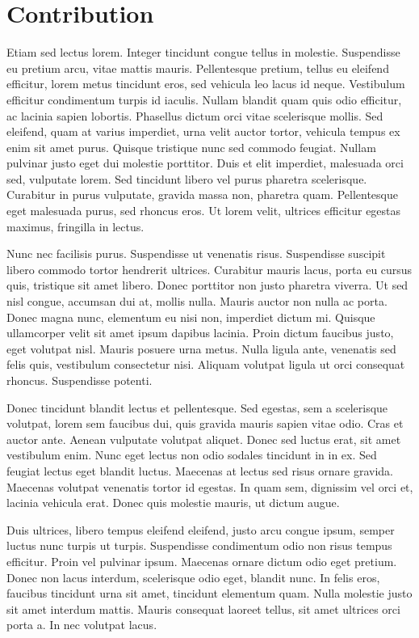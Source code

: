 \section{Contribution}%
Etiam sed lectus lorem. Integer tincidunt congue tellus in molestie. Suspendisse eu pretium arcu, vitae mattis mauris. Pellentesque pretium, tellus eu eleifend efficitur, lorem metus tincidunt eros, sed vehicula leo lacus id neque. Vestibulum efficitur condimentum turpis id iaculis. Nullam blandit quam quis odio efficitur, ac lacinia sapien lobortis. Phasellus dictum orci vitae scelerisque mollis. Sed eleifend, quam at varius imperdiet, urna velit auctor tortor, vehicula tempus ex enim sit amet purus. Quisque tristique nunc sed commodo feugiat. Nullam pulvinar justo eget dui molestie porttitor. Duis et elit imperdiet, malesuada orci sed, vulputate lorem. Sed tincidunt libero vel purus pharetra scelerisque. Curabitur in purus vulputate, gravida massa non, pharetra quam. Pellentesque eget malesuada purus, sed rhoncus eros. Ut lorem velit, ultrices efficitur egestas maximus, fringilla in lectus.

Nunc nec facilisis purus. Suspendisse ut venenatis risus. Suspendisse suscipit libero commodo tortor hendrerit ultrices. Curabitur mauris lacus, porta eu cursus quis, tristique sit amet libero. Donec porttitor non justo pharetra viverra. Ut sed nisl congue, accumsan dui at, mollis nulla. Mauris auctor non nulla ac porta. Donec magna nunc, elementum eu nisi non, imperdiet dictum mi. Quisque ullamcorper velit sit amet ipsum dapibus lacinia. Proin dictum faucibus justo, eget volutpat nisl. Mauris posuere urna metus. Nulla ligula ante, venenatis sed felis quis, vestibulum consectetur nisi. Aliquam volutpat ligula ut orci consequat rhoncus. Suspendisse potenti.

Donec tincidunt blandit lectus et pellentesque. Sed egestas, sem a scelerisque volutpat, lorem sem faucibus dui, quis gravida mauris sapien vitae odio. Cras et auctor ante. Aenean vulputate volutpat aliquet. Donec sed luctus erat, sit amet vestibulum enim. Nunc eget lectus non odio sodales tincidunt in in ex. Sed feugiat lectus eget blandit luctus. Maecenas at lectus sed risus ornare gravida. Maecenas volutpat venenatis tortor id egestas. In quam sem, dignissim vel orci et, lacinia vehicula erat. Donec quis molestie mauris, ut dictum augue.

Duis ultrices, libero tempus eleifend eleifend, justo arcu congue ipsum, semper luctus nunc turpis ut turpis. Suspendisse condimentum odio non risus tempus efficitur. Proin vel pulvinar ipsum. Maecenas ornare dictum odio eget pretium. Donec non lacus interdum, scelerisque odio eget, blandit nunc. In felis eros, faucibus tincidunt urna sit amet, tincidunt elementum quam. Nulla molestie justo sit amet interdum mattis. Mauris consequat laoreet tellus, sit amet ultrices orci porta a. In nec volutpat lacus. 